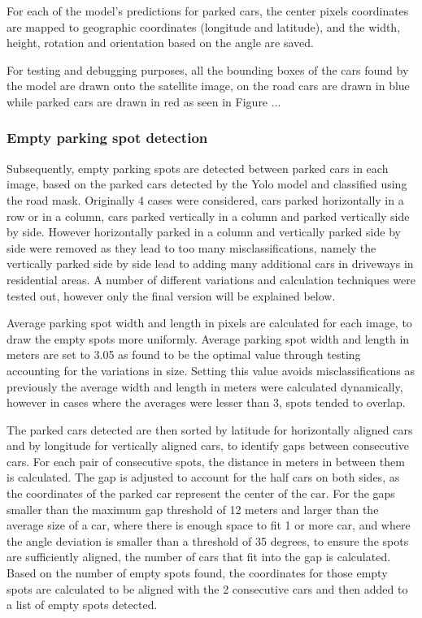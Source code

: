 For each of the model's predictions for parked cars, the center pixels coordinates are mapped to geographic coordinates (longitude and latitude), and the width, height, rotation and orientation based on the angle are saved.

For testing and debugging purposes, all the bounding boxes of the cars found by the model are drawn onto the satellite image, on the road cars are drawn in blue while parked cars are drawn in red as seen in Figure ...

\subsubsection{Empty parking spot detection}
Subsequently, empty parking spots are detected between parked cars in each image, based on the parked cars detected by the Yolo model and classified using the road mask.
Originally 4 cases were considered, cars parked horizontally in a row or in a column, cars parked vertically in a column and parked vertically side by side. However horizontally parked in a column and vertically parked side by side were removed as they lead to too many misclassifications, namely the vertically parked side by side lead to adding many additional cars in driveways in residential areas.
A number of different variations and calculation techniques were tested out, however only the final version will be explained below.

Average parking spot width and length in pixels are calculated for each image, to draw the empty spots more uniformly. Average parking spot width and length in meters are set to 3.05 as found to be the optimal value through testing accounting for the variations in size.
Setting this value avoids misclassifications as previously the average width and length in meters were calculated dynamically, however in cases where the averages were lesser than 3, spots tended to overlap.

The parked cars detected are then sorted by latitude for horizontally aligned cars and by longitude for vertically aligned cars, to identify gaps between consecutive cars.
For each pair of consecutive spots, the distance in meters in between them is calculated. The gap is adjusted to account for the half cars on both sides, as the coordinates of the parked car represent the center of the car.
For the gaps smaller than the maximum gap threshold of 12 meters and larger than the average size of a car, where there is enough space to fit 1 or more car, and where the angle deviation is smaller than a threshold of 35 degrees, to ensure the spots are sufficiently aligned, the number of cars that fit into the gap is calculated.
Based on the number of empty spots found, the coordinates for those empty spots are calculated to be aligned with the 2 consecutive cars and then added to a list of empty spots detected.

